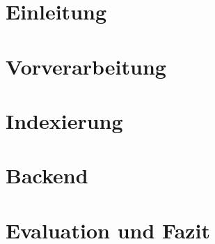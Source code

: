 




\pagestyle{empty} %



\pagestyle{useheadings} %
\setcounter{tocdepth}{3}    %
\setcounter{secnumdepth}{3} %

\tableofcontents %









\chapter{Einleitung}\label{ch:intro}


\chapter{Vorverarbeitung}\label{ch:prepros}


\chapter{Indexierung}\label{ch:indexing}


\chapter{Backend}\label{ch:backend}


\chapter{Evaluation und Fazit}\label{ch:results}






